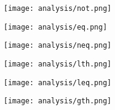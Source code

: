 \begin{multicols}{2}
\begin{center}
\texttt{[image: analysis/not.png]} 
\end{center}
\columnbreak
\begin{center}
\texttt{[image: analysis/eq.png]} 
\end{center}
\end{multicols}
\pagebreak

\begin{multicols}{2}
\begin{center}
\texttt{[image: analysis/neq.png]} 
\end{center}
\columnbreak
\begin{center}
\texttt{[image: analysis/lth.png]} 
\end{center}
\end{multicols}

\begin{multicols}{2}
\begin{center}
\texttt{[image: analysis/leq.png]} 
\end{center}
\columnbreak
\begin{center}
\texttt{[image: analysis/gth.png]} 
\end{center}
\end{multicols}

